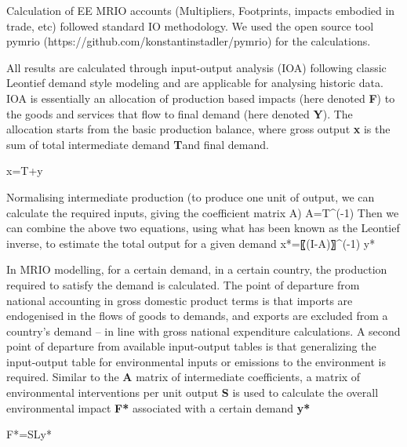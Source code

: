 Calculation of EE MRIO accounts (Multipliers, Footprints, impacts embodied in trade, etc) followed
standard IO methodology. We used the open source tool pymrio (https://github.com/konstantinstadler/pymrio) for the calculations.

All results are  calculated through input-output analysis (IOA) following classic Leontief demand style modeling and are applicable for analysing historic data. IOA is essentially an allocation of production based impacts (here denoted \textbf{F}) to the goods and services that flow to final demand (here denoted \textbf{Y}). The allocation starts from the basic production balance, where gross output \textbf{x} is the sum of total intermediate demand \textbf{T}and final demand.

x=T+y

Normalising intermediate production (to produce one unit of output, we can calculate the required inputs, giving the coefficient matrix A)
A=T^(-1) 
Then we can combine the above two equations, using what has been known as the Leontief inverse, to estimate the total output for a given demand
x*=〖(I-A)〗^(-1) y*

In MRIO modelling, for a certain demand, in a certain country, the production required to satisfy the demand is calculated. The point of departure from national accounting in gross domestic product terms is that imports are endogenised in the flows of goods to demands, and exports are excluded from a country’s demand – in line with gross national expenditure calculations. A second point of departure from available input-output tables is that generalizing the input-output table for environmental inputs or emissions to the environment is required. Similar to the \textbf{A} matrix of intermediate coefficients, a matrix of environmental interventions per unit output \textbf{S} is used to calculate the overall environmental impact \textbf{F*} associated with a certain demand \textbf{y*} 

F*=SLy*
